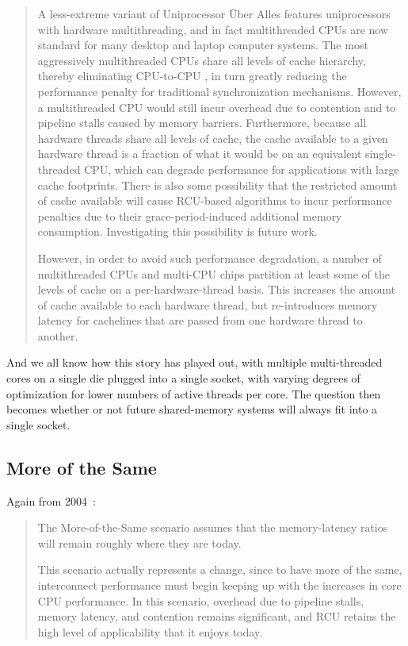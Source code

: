 \begin{quote}
	A less-extreme variant of Uniprocessor \"Uber Alles features
	uniprocessors with hardware multithreading, and in fact
	multithreaded CPUs are now standard for many desktop and laptop
	computer systems.
	The most aggressively multithreaded CPUs share all levels of
	cache hierarchy, thereby eliminating CPU-to-CPU ,
	in turn greatly reducing the performance penalty for traditional
	synchronization mechanisms.
	However, a multithreaded CPU would still incur overhead due to
	contention and to pipeline stalls caused by memory barriers.
	Furthermore, because all hardware threads share all levels
	of cache, the cache available to a given hardware thread is a
	fraction of what it would be on an equivalent single-threaded
	CPU, which can degrade performance for applications with large
	cache footprints.
	There is also some possibility that the restricted amount of cache
	available will cause RCU-based algorithms to incur performance
	penalties due to their grace-period-induced additional memory
	consumption.
	Investigating this possibility is future work.

	However, in order to avoid such performance degradation, a number
	of multithreaded CPUs and multi-CPU chips partition at least
	some of the levels of cache on a per-hardware-thread basis.
	This increases the amount of cache available to each hardware
	thread, but re-introduces memory latency for cachelines that
	are passed from one hardware thread to another.
\end{quote}

And we all know how this story has played out, with multiple multi-threaded
cores on a single die plugged into a single socket, with varying degrees
of optimization for lower numbers of active threads per core.
The question then becomes whether or not future shared-memory systems will
always fit into a single socket.

\subsection{More of the Same}
\label{sec:meas:More of the Same}

Again from 2004~\cite{PaulEdwardMcKenneyPhD}:

\begin{quote}
	The More-of-the-Same scenario assumes that the memory-latency
	ratios will remain roughly where they are today.

	This scenario actually represents a change, since to have more
	of the same, interconnect performance must begin keeping up
	with the  increases in core CPU performance.
	In this scenario, overhead due to pipeline stalls, memory latency,
	and contention remains significant, and RCU retains the high
	level of applicability that it enjoys today.
\end{quote}

